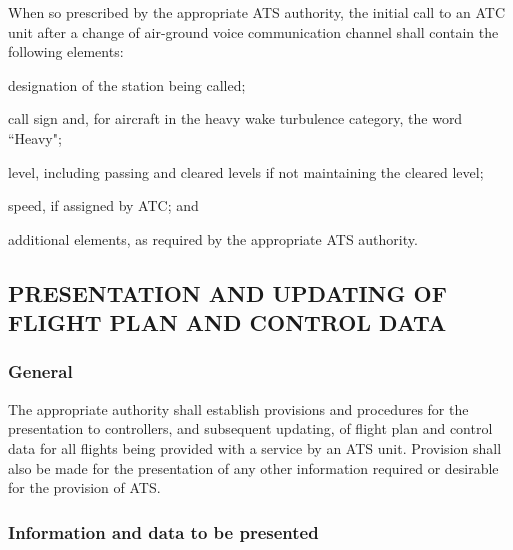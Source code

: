 \documentclass[../vATM.tex]{subfiles}
\begin{document}
    When so prescribed by the appropriate ATS authority, the initial call to an ATC unit after a change of air-ground voice communication channel shall contain the following elements:
    
    \begin{enumalph}
        \item designation of the station being called;
        \item call sign and, for aircraft in the heavy wake turbulence category, the word ``Heavy";
        \item level, including passing and cleared levels if not maintaining the cleared level;
        \item speed, if assigned by ATC; and
        \item additional elements, as required by the appropriate ATS authority.
    \end{enumalph}



    \subsection[Presentation and updating of flight plan and control data]{PRESENTATION AND UPDATING OF \\ FLIGHT PLAN AND CONTROL DATA}

    \subsubsection{General}

    The appropriate authority shall establish provisions and procedures for the presentation to controllers, and subsequent updating, of flight plan and control data for all flights being provided with a service by an ATS unit. Provision shall also be made for the presentation of any other information required or desirable for the provision of ATS.

    \subsubsection{Information and data to be presented}
\end{document}
